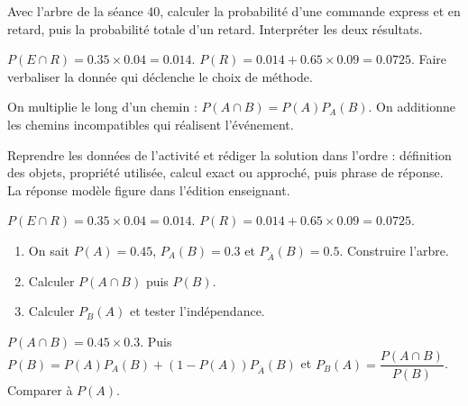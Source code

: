     \begin{activity}
    Avec l'arbre de la séance 40, calculer la probabilité d'une commande express et en retard, puis la probabilité totale d'un retard. Interpréter les deux résultats.
    \begin{center}\end{center}
    \end{activity}
    \begin{solution}$P(E\cap R)=\num{0,35}\times\num{0,04}=\num{0,014}$. $P(R)=\num{0,014}+\num{0,65}\times\num{0,09}=\num{0,0725}$. Faire verbaliser la donnée qui déclenche le choix de méthode.\end{solution}

    \begin{summary}On multiplie le long d'un chemin : $P(A\cap B)=P(A)P_A(B)$. On additionne les chemins incompatibles qui réalisent l'événement.\end{summary}

    \begin{example}
    Reprendre les données de l'activité et rédiger la solution dans l'ordre : définition des objets, propriété utilisée, calcul exact ou approché, puis phrase de réponse. La réponse modèle figure dans l'édition enseignant.
    \end{example}
    \begin{solution}$P(E\cap R)=\num{0,35}\times\num{0,04}=\num{0,014}$. $P(R)=\num{0,014}+\num{0,65}\times\num{0,09}=\num{0,0725}$.\end{solution}

    \begin{exercise}[essentiel]
    \begin{enumerate}\item On sait $P(A)=\num{0,45}$, $P_A(B)=\num{0,3}$ et $P_{\overline A}(B)=\num{0,5}$. Construire l'arbre.\item Calculer $P(A\cap B)$ puis $P(B)$.\item Calculer $P_B(A)$ et tester l'indépendance.\end{enumerate}
    \end{exercise}
    \begin{solution}$P(A\cap B)=\num{0,45}\times\num{0,3}$. Puis $P(B)=P(A)P_A(B)+(1-P(A))P_{\overline A}(B)$ et $P_B(A)=\dfrac{P(A\cap B)}{P(B)}$. Comparer à $P(A)$.\end{solution}


